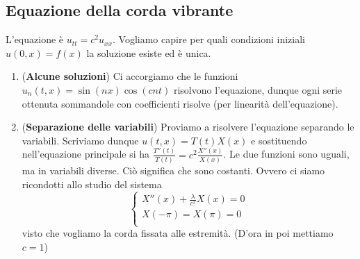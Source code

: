 \documentclass[a4paper,NoNotes,GeneralMath]{stdmdoc}
\begin{document}
        \subsection*{Equazione della corda vibrante}
        L'equazione è $u_{tt} = c^2 u_{xx}$. Vogliamo capire per quali condizioni iniziali $u(0, x) = f(x)$ la soluzione esiste ed è unica.
        \begin{enumerate}
        \item ({\bf Alcune soluzioni}) Ci accorgiamo che le funzioni $u_n(t, x) = \sin(nx) \cos(cnt)$ risolvono l'equazione, dunque ogni serie ottenuta sommandole con coefficienti risolve (per linearità dell'equazione).
        \item ({\bf Separazione delle variabili}) Proviamo a risolvere l'equazione separando le variabili. Scriviamo dunque $u(t, x) = T(t) X(x)$ e sostituendo nell'equazione principale si ha $\frac{T''(t)}{T(t)} = c^2 \frac{X''(x)}{X(x)}$. Le due funzioni sono uguali, ma in variabili diverse. Ciò significa che sono costanti. Ovvero ci siamo ricondotti allo studio del sistema $$\left\{ \begin{array}{c} X''(x) + \frac{\lambda}{c^2} X(x) = 0 \\ X(-\pi) = X(\pi) = 0 \\ \end{array} \right.$$ visto che vogliamo la corda fissata alle estremità. (D'ora in poi mettiamo $c = 1$)
        \end{enumerate}


        
        
\end{document}
